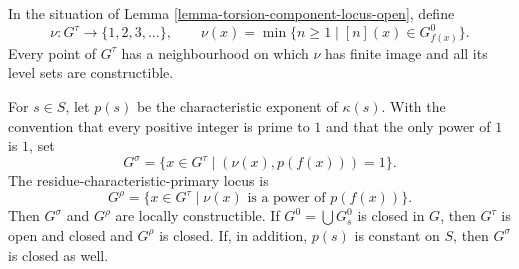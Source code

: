 \begin{lemma}
\label{lemma-order-in-component-group-constructible}
In the situation of Lemma \ref{lemma-torsion-component-locus-open}, define
$$
\nu : G^\tau \longrightarrow \{1, 2, 3, \ldots\}, \qquad
\nu(x) = \min\{n \geq 1 \mid [n](x) \in G_{f(x)}^0\}.
$$
Every point of $G^\tau$ has a neighbourhood on which $\nu$ has finite image
and all its level sets are constructible.

For $s \in S$, let $p(s)$ be the characteristic exponent of $\kappa(s)$.
With the convention that every positive integer is prime to $1$ and that
the only power of $1$ is $1$, set
$$
G^\sigma = \{x \in G^\tau \mid (\nu(x),p(f(x)))=1\}.
$$
The residue-characteristic-primary locus is
$$
G^\rho = \{x \in G^\tau \mid
\nu(x)\text{ is a power of }p(f(x))\}.
$$
Then $G^\sigma$ and $G^\rho$ are locally constructible. If
$G^0 = \bigcup G_s^0$ is closed in $G$, then $G^\tau$ is open and closed and
$G^\rho$ is closed. If, in addition, $p(s)$ is constant on $S$, then
$G^\sigma$ is closed as well.
\end{lemma}

